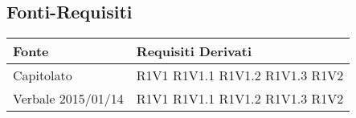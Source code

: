 	\subsection{Fonti-Requisiti} %
	\label{sub:fonti_requisiti}

	\begin{center}

	\def\arraystretch{1.5}
	\bgroup
	\begin{longtable}{| p{4cm} | p{4cm} |}

		\hline
		\textbf{Fonte} & \textbf{Requisiti Derivati} \\
		\hline

		Capitolato  &  R1V1 \newline R1V1.1 \newline R1V1.2 \newline R1V1.3 \newline R1V2 \\
		\hline
		Verbale 2015/01/14  &  R1V1 \newline R1V1.1 \newline R1V1.2 \newline R1V1.3 \newline R1V2  \\
		\hline

	\end{longtable}
	\egroup
	\end{center}

	





